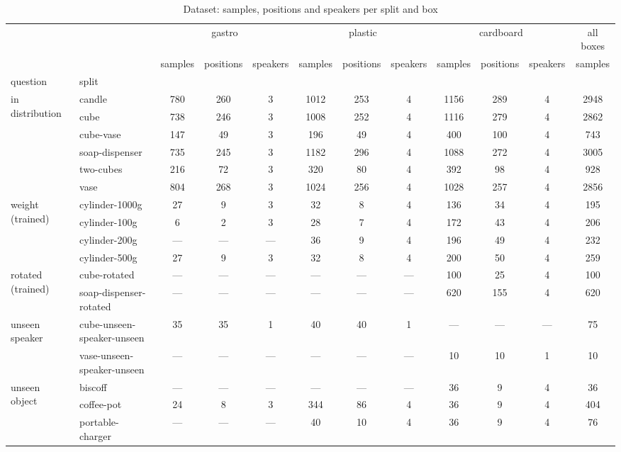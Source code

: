 \begin{table}
\caption{Dataset: samples, positions and speakers per split and box}
\label{tab:dataset}
\begin{tabular}{ll|ccc|ccc|ccc|c}
\toprule
 &  & \multicolumn{3}{c}{gastro} & \multicolumn{3}{c}{plastic} & \multicolumn{3}{c}{cardboard} & all boxes \\
 &  & samples & positions & speakers & samples & positions & speakers & samples & positions & speakers & samples \\
question & split &  &  &  &  &  &  &  &  &  &  \\
\midrule
\multirow[t]{6}{*}{in distribution} & candle & 780 & 260 & 3 & 1012 & 253 & 4 & 1156 & 289 & 4 & 2948 \\
 & cube & 738 & 246 & 3 & 1008 & 252 & 4 & 1116 & 279 & 4 & 2862 \\
 & cube-vase & 147 & 49 & 3 & 196 & 49 & 4 & 400 & 100 & 4 & 743 \\
 & soap-dispenser & 735 & 245 & 3 & 1182 & 296 & 4 & 1088 & 272 & 4 & 3005 \\
 & two-cubes & 216 & 72 & 3 & 320 & 80 & 4 & 392 & 98 & 4 & 928 \\
 & vase & 804 & 268 & 3 & 1024 & 256 & 4 & 1028 & 257 & 4 & 2856 \\
\cline{1-12}
\multirow[t]{4}{*}{weight (trained)} & cylinder-1000g & 27 & 9 & 3 & 32 & 8 & 4 & 136 & 34 & 4 & 195 \\
 & cylinder-100g & 6 & 2 & 3 & 28 & 7 & 4 & 172 & 43 & 4 & 206 \\
 & cylinder-200g & — & — & — & 36 & 9 & 4 & 196 & 49 & 4 & 232 \\
 & cylinder-500g & 27 & 9 & 3 & 32 & 8 & 4 & 200 & 50 & 4 & 259 \\
\cline{1-12}
\multirow[t]{2}{*}{rotated (trained)} & cube-rotated & — & — & — & — & — & — & 100 & 25 & 4 & 100 \\
 & soap-dispenser-rotated & — & — & — & — & — & — & 620 & 155 & 4 & 620 \\
\cline{1-12}
\multirow[t]{2}{*}{unseen speaker} & cube-unseen-speaker-unseen & 35 & 35 & 1 & 40 & 40 & 1 & — & — & — & 75 \\
 & vase-unseen-speaker-unseen & — & — & — & — & — & — & 10 & 10 & 1 & 10 \\
\cline{1-12}
\multirow[t]{4}{*}{unseen object} & biscoff & — & — & — & — & — & — & 36 & 9 & 4 & 36 \\
 & coffee-pot & 24 & 8 & 3 & 344 & 86 & 4 & 36 & 9 & 4 & 404 \\
 & portable-charger & — & — & — & 40 & 10 & 4 & 36 & 9 & 4 & 76 \\

\end{tabular}
\end{table}
